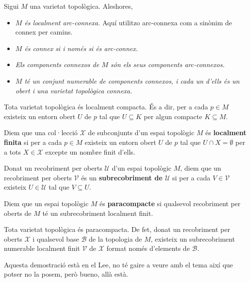 \begin{prop}
Sigui $M$ una varietat topològica. Aleshores, 
\end{prop}
{
    \begin{itemize}
        \item \textit{$M$ és localment arc-connexa.}{\color{blue} Aquí utilitzo arc-connexa com a sinònim de connex per camins.}
        \item \textit{$M$ és connex si i només si és arc-connex.}
        \item \textit{Els components connexos de $M$ són els seus components arc-connexos.}
        \item \textit{$M$ té un conjunt numerable de components connexos, i cada un d'ells és un obert i una varietat topològica connexa.}
    \end{itemize}
}
\begin{prop}
    Tota varietat topològica és localment compacta. És a dir, per a cada $p\in M$ existeix un entorn obert $U$ de $p$ tal que $U\subseteq K$ per algun compacte $K\subseteq M$.
\end{prop}
\begin{defi}
    Diem que una col·lecció $\mathcal X$ de subconjunts d'un espai topològic $M$ és \textbf{localment finita} si per a cada $p\in M$ existeix un entorn obert $U$ de $p$ tal que $U\cap X = \emptyset$ per a tots $X\in\mathcal X$ excepte un nombre finit d'ells.
\end{defi}
\begin{defi}
    Donat un recobriment per oberts $\mathcal U$ d'un espai topològic $M$, diem que un recobriment per oberts $\mathcal V$ és un \textbf{subrecobriment de $\mathcal U$} si per a cada $V\in\mathcal V$ existeix $U\in\mathcal U$ tal que $V\subseteq U$.
\end{defi}
\begin{defi}
    Diem que un espai topològic $M$ és \textbf{paracompacte} si qualsevol recobriment per oberts de $M$ té un subrecobriment localment finit.
\end{defi}
\begin{teo}
    Tota varietat topològica és paracompacta. De fet, donat un recobriment per oberts $\mathcal X$ i qualsevol base $\mathcal B$ de la topologia de $M$, existeix un subrecobriment numerable localment finit $\mathcal V$ de $\mathcal X$ format només d'elements de $\mathcal B$.
\end{teo}
{\color{blue} Aquesta demostració està en el Lee, no té gaire a veure amb el tema així que potser no la posem, però bueno, allà està.}
